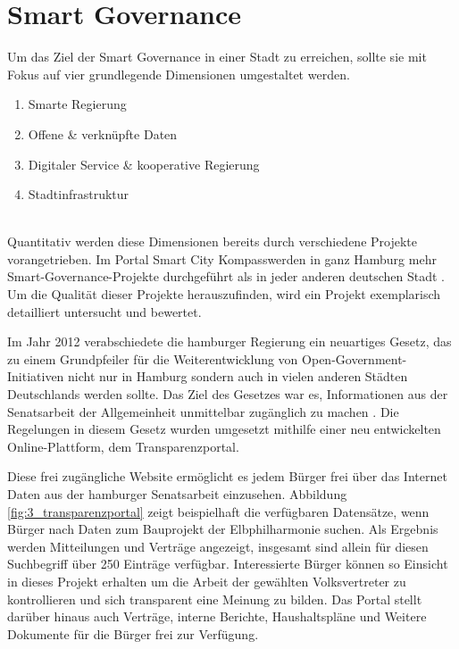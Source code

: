 \section{Smart Governance}
\label{sec:smart_governance}

Um das Ziel der Smart Governance in einer Stadt zu erreichen, sollte sie mit Fokus auf vier grundlegende Dimensionen umgestaltet werden.
\begin{enumerate}
	\item Smarte Regierung
	\item Offene \& verknüpfte Daten
	\item Digitaler Service \& kooperative Regierung
	\item Stadtinfrastruktur
\end{enumerate}
\autocite[14]{Fuetterer.2020}
\\ Quantitativ werden diese Dimensionen bereits durch verschiedene Projekte vorangetrieben. Im Portal \glqq Smart City Kompass\grqq\space werden in ganz Hamburg mehr Smart-Governance-Projekte durchgeführt als in jeder anderen deutschen Stadt \autocite{SmartCityKompass.2020}. Um die Qualität dieser Projekte herauszufinden, wird ein Projekt exemplarisch detailliert untersucht und bewertet.


Im Jahr 2012 verabschiedete die hamburger Regierung ein neuartiges Gesetz, das zu einem Grundpfeiler für die Weiterentwicklung von Open-Government-Initiativen nicht nur in Hamburg sondern auch in vielen anderen Städten Deutschlands werden sollte. Das Ziel des Gesetzes war es, Informationen aus der Senatsarbeit der Allgemeinheit unmittelbar zugänglich zu machen \autocite{Senat.2012}. Die Regelungen in diesem Gesetz wurden umgesetzt mithilfe einer neu entwickelten Online-Plattform, dem \glqq Transparenzportal\grqq.


Diese frei zugängliche Website ermöglicht es jedem Bürger frei über das Internet Daten aus der hamburger Senatsarbeit einzusehen. Abbildung \ref{fig:3_transparenzportal} zeigt beispielhaft die verfügbaren Datensätze, wenn Bürger nach Daten zum Bauprojekt der Elbphilharmonie suchen. Als Ergebnis werden Mitteilungen und Verträge angezeigt, insgesamt sind allein für diesen Suchbegriff über 250 Einträge verfügbar. Interessierte Bürger können so Einsicht in dieses Projekt erhalten um die Arbeit der gewählten Volksvertreter zu kontrollieren und sich transparent eine Meinung zu bilden. Das Portal stellt darüber hinaus auch Verträge, interne Berichte, Haushaltspläne und Weitere Dokumente für die Bürger frei zur Verfügung.

